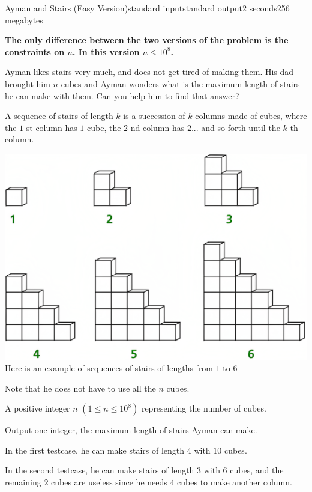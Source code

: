 \begin{problem}{Ayman and Stairs (Easy Version)}{standard input}{standard output}{2 seconds}{256 megabytes}

\textbf{The only difference between the two versions of the problem is the constraints on $n$. In this version $n \leq 10^8$.}

Ayman likes stairs very much, and does not get tired of making them. His dad brought him $n$ cubes and Ayman wonders what is the maximum length of stairs he can make with them. Can you help him to find that answer?

A sequence of stairs of length $k$ is a succession of $k$ columns made of cubes, where the $1$-st column has $1$ cube, the $2$-nd column has $2$... and so forth until the $k$-th column.

\begin{center}
\includegraphics[width=16cm]{figure-1_2.png}
\small{Here is an example of sequences of stairs of lengths from $1$ to $6$}
\end{center}

Note that he does not have to use all the $n$ cubes.

\InputFile
A positive integer $n$ $(1 \leq n \leq 10^8)$ representing the number of cubes.

\OutputFile
Output one integer, the maximum length of stairs Ayman can make.

\Examples

\begin{example}
%
%
\end{example}

\Note
In the first testcase, he can make stairs of length $4$ with $10$ cubes.

In the second testcase, he can make stairs of length $3$ with $6$ cubes, and the remaining $2$  cubes are useless since he needs $4$ cubes to make another column.

\end{problem}

